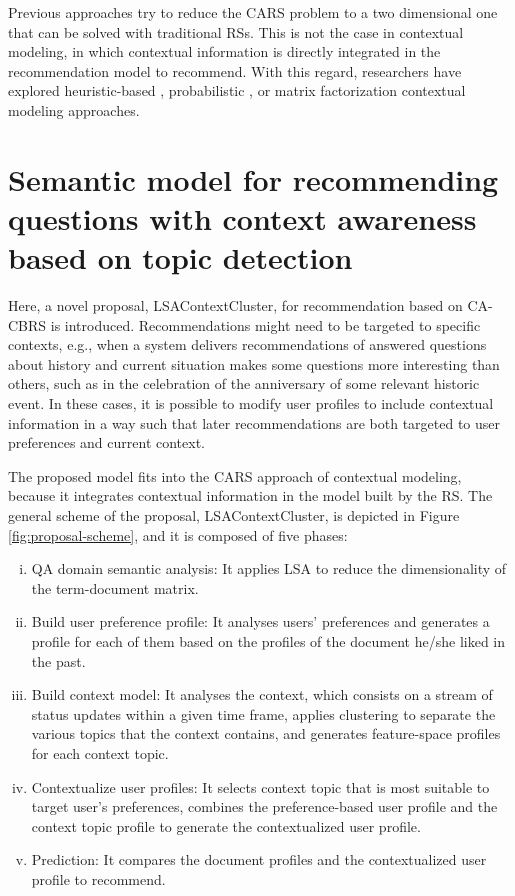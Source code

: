 \documentclass[preprint]{elsarticle}
\begin{document}
\begin{spacing}{1.5}
Previous approaches try to reduce the CARS problem to a two dimensional one that can be solved with traditional RSs. This is not the case in contextual modeling, in which contextual information is directly integrated in the recommendation model to recommend. With this regard, researchers have explored heuristic-based \cite{Panniello2014}, probabilistic \cite{Adomavicius2005b}, or matrix factorization \cite{Baltrunas2011c} contextual modeling approaches.

\section{Semantic model for recommending questions with context awareness based on topic detection}
\label{sec:proposal}

Here, a novel proposal, LSAContextCluster, for recommendation based on CA-CBRS is introduced. Recommendations might need to be targeted to specific contexts, e.g., when a system delivers recommendations of answered questions about history and current situation makes some questions more interesting than others, such as in the celebration of the anniversary of some relevant historic event. In these cases, it is possible to modify user profiles to include contextual information in a way such that later recommendations are both targeted to user preferences and current context.

The proposed model fits into the CARS approach of contextual modeling, because it integrates contextual information in the model built by the RS. The general scheme of the proposal, LSAContextCluster, is depicted in Figure \ref{fig:proposal-scheme}, and it is composed of five phases:
\begin{enumerate}[(i)]
	\item QA domain semantic analysis: It applies LSA to reduce the dimensionality of the term-document matrix.
	\item Build user preference profile: It analyses users' preferences and generates a profile for each of them based on the profiles of the document he/she liked in the past.
	\item Build context model: It analyses the context, which consists on a stream of status updates within a given time frame, applies clustering to separate the various topics that the context contains, and generates feature-space profiles for each context topic.
	\item Contextualize user profiles: It selects context topic that is most suitable to target user's preferences, combines the preference-based user profile and the context topic profile to generate the contextualized user profile.
	\item Prediction: It compares the document profiles and the contextualized user profile to recommend.
\end{enumerate}


\end{spacing}
\end{document}

